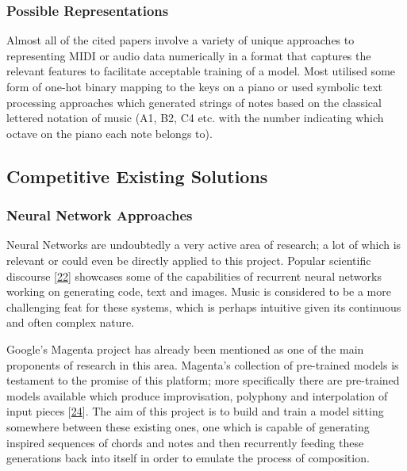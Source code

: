 \documentclass[12pt,]{article}
\begin{document}
\hypertarget{possible-representations}{%
\subsubsection{Possible
Representations}\label{possible-representations}}

Almost all of the cited papers involve a variety of unique approaches to
representing MIDI or audio data numerically in a format that captures
the relevant features to facilitate acceptable training of a model. Most
utilised some form of one-hot binary mapping to the keys on a piano or
used symbolic text processing approaches which generated strings of
notes based on the classical lettered notation of music (A1, B2, C4 etc.
with the number indicating which octave on the piano each note belongs
to).

\hypertarget{competitive-existing-solutions}{%
\subsection{Competitive Existing
Solutions}\label{competitive-existing-solutions}}

\hypertarget{neural-network-approaches}{%
\subsubsection{Neural Network
Approaches}\label{neural-network-approaches}}

Neural Networks are undoubtedly a very active area of research; a lot of
which is relevant or could even be directly applied to this project.
Popular scientific discourse
{[}\protect\hyperlink{ref-alextavgen}{22}{]} showcases some of the
capabilities of recurrent neural networks working on generating code,
text and images. Music is considered to be a more challenging feat for
these systems, which is perhaps intuitive given its continuous and often
complex nature.

Google's Magenta project has already been mentioned as one of the main
proponents of research in this area. Magenta's collection of pre-trained
models is testament to the promise of this platform; more specifically
there are pre-trained models available which produce improvisation,
polyphony and interpolation of input pieces
{[}\protect\hyperlink{ref-magentamodels}{24}{]}. The aim of this project
is to build and train a model sitting somewhere between these existing
ones, one which is capable of generating inspired sequences of chords
and notes and then recurrently feeding these generations back into
itself in order to emulate the process of composition.
\end{document}
